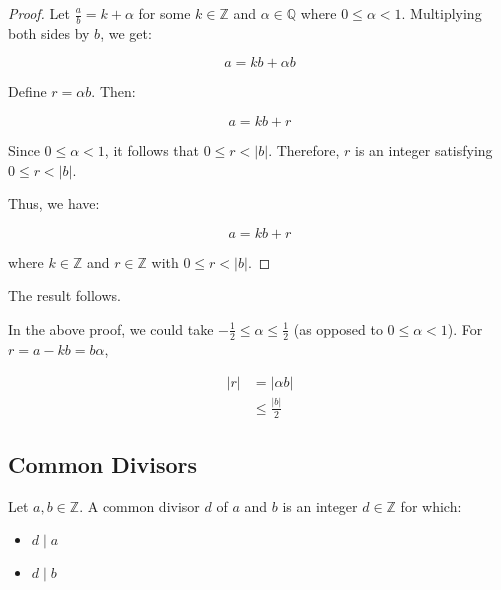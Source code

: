 \documentclass[11pt, draft]{article}
\begin{document}
\begin{proof}
    Let \( \frac{a}{b} = k + \alpha \) for some \( k \in \mathbb{Z} \) and \( \alpha \in \mathbb{Q} \) where \( 0 \leq \alpha < 1 \). Multiplying both sides by \( b \), we get:

    \[ a = kb + \alpha b \]

    Define \( r = \alpha b \). Then:

    \[ a = kb + r \]

    Since \( 0 \leq \alpha < 1 \), it follows that \( 0 \leq r < |b| \). Therefore,
    \( r \) is an integer satisfying \( 0 \leq r < |b| \).

    Thus, we have:

    \[ a = kb + r \]

    where \( k \in \mathbb{Z} \) and \( r \in \mathbb{Z} \) with \( 0 \leq r < |b|
    \).

\end{proof}
The result follows.

\begin{remark} In the above proof, we could take \(-\frac{1}{2} \leq \alpha \leq \frac{1}{2}\) (as opposed to \(0 \leq \alpha < 1\)). For \(r = a - kb = b\alpha\),

    \[
        \begin{aligned}
            |r| & = |\alpha b|       \\
                & \leq \frac{|b|}{2}
        \end{aligned}
    \]
\end{remark}
\subsection{Common Divisors}
\begin{definition}
    Let \(a, b \in \mathbb{Z}\). A common divisor \(d\) of \(a\) and \(b\) is an integer \(d \in \mathbb{Z}\) for which:
    \begin{itemize}
        \item \(d \mid a\)
        \item \(d \mid b\)
    \end{itemize}
\end{definition}
\end{document}
